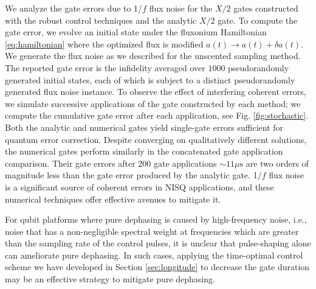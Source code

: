 \documentclass[
  amsfonts,
  amsmath,
  amssymb,
  pra,
  twocolumn,
  superscriptaddress,
]{revtex4-2}
\begin{document}
We analyze the gate errors due to 1/$f$ flux noise for
the $X/2$ gates constructed with the robust control techniques
and the analytic $X/2$ gate. To compute the gate error,
we evolve an initial state
under the fluxonium Hamiltonian \eqref{eq:hamiltonian}
where the optimized flux is modified $a(t) \rightarrow a(t) + \delta a(t)$.
We generate the flux noise as
we described for the unscented sampling method.
The reported gate error is the infidelity
averaged over $1000$ pseudorandomly generated initial states,
each of which is subject to a distinct pseudorandomly
generated flux noise instance.
To observe the effect of interfering coherent errors,
we simulate successive applications of the gate constructed by each method;
we compute the cumulative gate error
after each application, see Fig. \ref{fig:stochastic}.
Both the analytic
and numerical gates yield single-gate errors
sufficient for quantum error correction.
Despite converging on qualitatively different solutions, the
numerical gates perform similarly in the concatenated
gate application comparison. Their gate errors
after $200$ gate applications $\sim 11 \mu\textrm{s}$ are
two orders of magnitude less than the gate error produced by the analytic gate.
1/$f$ flux noise is a significant source of coherent errors in NISQ applications,
and these numerical techniques offer effective avenues to mitigate it.

For qubit platforms where pure dephasing is caused by high-frequency noise,
i.e., noise that has a non-negligible spectral weight at frequencies which are greater
than the sampling rate of the control pulses, it is unclear that pulse-shaping alone
can ameliorate pure dephasing. In such cases, applying the time-optimal control
scheme we have developed in Section \ref{sec:longitude} to decrease the gate duration may be an effective
strategy to mitigate pure dephasing.


\end{document}
